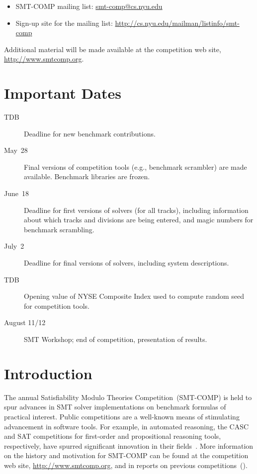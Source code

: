 \documentclass[12pt]{article}
\begin{document}
\begin{itemize}
\item SMT-COMP mailing list:
  \href{mailto:smt-comp@cs.nyu.edu}{\textrm{smt-comp@cs.nyu.edu}}
\item Sign-up site for the mailing list:
  \url{http://cs.nyu.edu/mailman/listinfo/smt-comp}
\end{itemize}

\noindent Additional material will be made available at the
competition web site, \url{http://www.smtcomp.org}.


\newpage

\section{Important Dates}
\label{sec:important}

\begin{description}
\item[TDB] Deadline for new benchmark contributions.
\item[May~28] Final versions of competition tools (e.g., benchmark
  scrambler) are made available.  Benchmark libraries are frozen.
\item[June~18] Deadline for first versions of solvers (for all tracks),
  including information about which tracks and divisions are being
  entered, and magic numbers for benchmark scrambling.
\item[July~2] Deadline for final versions of solvers, including
  system descriptions.
\item[TDB] Opening value of NYSE Composite Index used to compute
  random seed for competition tools.
\item[August 11/12] SMT Workshop; end of competition, presentation of
  results.
\end{description}


\section{Introduction}

The annual Satisfiability Modulo Theories Competition~(SMT-COMP) is
held to spur advances in SMT solver implementations on benchmark
formulas of practical interest.  Public competitions are a well-known
means of stimulating advancement in software tools.  For example, in
automated reasoning, the CASC and SAT competitions for first-order and
propositional reasoning tools, respectively, have spurred significant
innovation in their fields~\cite{leberre+03,PSS02}.  More information
on the history and motivation for SMT-COMP can be found at the
competition web site, \url{http://www.smtcomp.org}, and in reports on
previous
competitions~(\cite{SMTCOMP-JAR,SMTCOMP-FMSD,BDOS08,SMTCOMP-2008,CDW14,SMTCOMP-2012,CSW15}).
\end{document}

